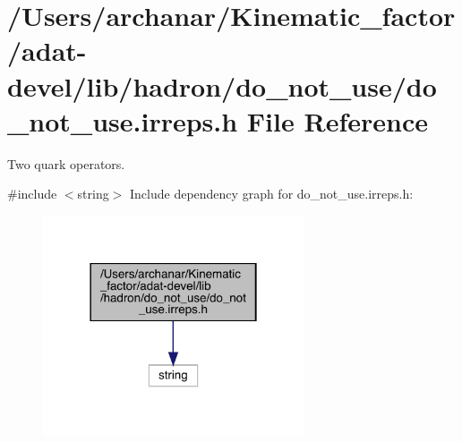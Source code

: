 \hypertarget{adat-devel_2lib_2hadron_2do__not__use_2do__not__use_8irreps_8h}{}\section{/\+Users/archanar/\+Kinematic\+\_\+factor/adat-\/devel/lib/hadron/do\+\_\+not\+\_\+use/do\+\_\+not\+\_\+use.irreps.\+h File Reference}
\label{adat-devel_2lib_2hadron_2do__not__use_2do__not__use_8irreps_8h}


Two quark operators.  


{\ttfamily \#include $<$string$>$}\newline
Include dependency graph for do\+\_\+not\+\_\+use.\+irreps.\+h\+:
\nopagebreak
\begin{figure}[H]
\begin{center}
\leavevmode
\includegraphics[width=218pt]{d5/d88/adat-devel_2lib_2hadron_2do__not__use_2do__not__use_8irreps_8h__incl}
\end{center}
\end{figure}
